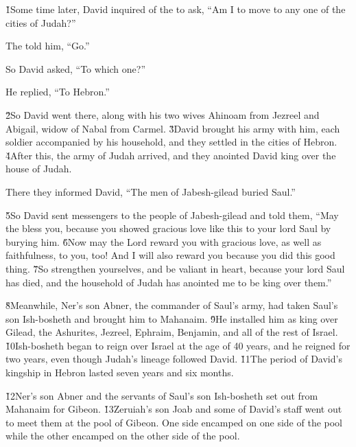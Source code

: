 \v{1}Some time later, David inquired of the  to ask, ``Am I to move to any one of the cities of Judah?''

The  told him, ``Go.''

So David asked, ``To which one?''

He replied, ``To Hebron.''

\v{2}So David went there, along with his two wives Ahinoam from Jezreel and Abigail, widow of Nabal from Carmel. \v{3}David brought his army with him, each soldier accompanied by his household, and they settled in the cities of Hebron. \v{4}After this, the army of Judah arrived, and they anointed David king over the house of Judah.

There they informed David, ``The men of Jabesh-gilead buried Saul.''

\v{5}So David sent messengers to the people of Jabesh-gilead and told them, ``May the  bless you, because you showed gracious love like this to your lord Saul by burying him. \v{6}Now may the Lord reward you with gracious love, as well as faithfulness, to you, too! And I will also reward you because you did this good thing. \v{7}So strengthen yourselves, and be valiant in heart, because your lord Saul has died, and the household of Judah has anointed me to be king over them.''

\v{8}Meanwhile, Ner's son Abner, the commander of Saul's army, had taken Saul's son Ish-bosheth and brought him to Mahanaim. \v{9}He installed him as king over Gilead, the Ashurites, Jezreel, Ephraim, Benjamin, and all of the rest of Israel. \v{10}Ish-bosheth began to reign over Israel at the age of 40 years, and he reigned for two years, even though Judah's lineage followed David. \v{11}The period of David's kingship in Hebron lasted seven years and six months.

\v{12}Ner's son Abner and the servants of Saul's son Ish-bosheth set out from Mahanaim for Gibeon. \v{13}Zeruiah's son Joab and some of David's staff went out to meet them at the pool of Gibeon. One side encamped on one side of the pool while the other encamped on the other side of the pool.

